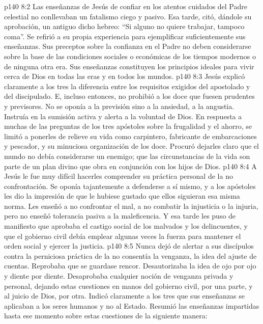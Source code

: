\vs p140 8:2  Las enseñanzas de Jesús de confiar en los atentos cuidados del Padre celestial no conllevaban un fatalismo ciego y pasivo. Esa tarde, citó, dándole su aprobación, un antiguo dicho hebreo: “Si alguno no quiere trabajar, tampoco coma”. Se refirió a su propia experiencia para ejemplificar suficientemente sus enseñanzas. Sus preceptos sobre la confianza en el Padre no deben considerarse sobre la base de las condiciones sociales o económicas de los tiempos modernos o de ninguna otra era. Sus enseñanzas constituyen los principios ideales para vivir cerca de Dios en todas las eras y en todos los mundos.
\vs p140 8:3 Jesús explicó claramente a los tres la diferencia entre los requisitos exigidos del apostolado y del discipulado. E, incluso entonces, no prohibió a los doce que fuesen prudentes y previsores. No se oponía a la previsión sino a la ansiedad, a la angustia. Instruía en la sumisión activa y alerta a la voluntad de Dios. En respuesta a muchas de las preguntas de los tres apóstoles sobre la frugalidad y el ahorro, se limitó a ponerles de relieve su vida como carpintero, fabricante de embarcaciones y pescador, y su minuciosa organización de los doce. Procuró dejarles claro que el mundo no debía considerarse un enemigo; que las circunstancias de la vida son parte de un plan divino que obra en conjunción con los hijos de Dios.
\vs p140 8:4 A Jesús le fue muy difícil hacerles comprender su práctica personal de la no confrontación. Se oponía tajantemente a defenderse a sí mismo, y a los apóstoles les dio la impresión de que le hubiese gustado que ellos siguieran esa misma norma. Les enseñó a no confrontar el mal, a no combatir la injusticia o la injuria, pero no enseñó tolerancia pasiva a la maleficencia. Y esa tarde les puso de manifiesto que aprobaba el castigo social de los malvados y los delincuentes, y que el gobierno civil debía emplear algunas veces la fuerza para mantener el orden social y ejercer la justicia.
\vs p140 8:5 Nunca dejó de alertar a sus discípulos contra la perniciosa práctica de la  no consentía la venganza, la idea del ajuste de cuentas. Reprobaba que se guardase rencor. Desautorizaba la idea de ojo por ojo y diente por diente. Desaprobaba cualquier noción de venganza privada y personal, dejando estas cuestiones en manos del gobierno civil, por una parte, y al juicio de Dios, por otra. Indicó claramente a los tres que sus enseñanzas se aplicaban a los seres humanos  y no al Estado. Resumió las enseñanzas impartidas hasta ese momento sobre estas cuestiones de la siguiente manera:
